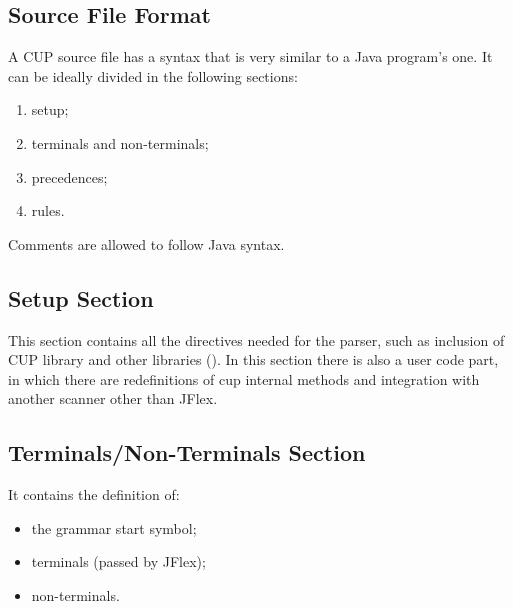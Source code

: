 \subsection{Source File Format}
A CUP source file has a syntax that is very similar to a Java program's one.
It can be ideally divided in the following sections:
\begin{enumerate}
	\item
	setup;
	\item
	terminals and non-terminals;
	\item
	precedences;
	\item
	rules.
\end{enumerate}

Comments are allowed to follow Java syntax.

\subsection{Setup Section}
This section contains all the directives needed for the parser, such as inclusion of CUP library and other libraries ().
In this section there is also a user code part, in which there are redefinitions of cup internal methods and integration with another scanner other than JFlex.

\subsection{Terminals/Non-Terminals Section}
It contains the definition of:
\begin{itemize}
	\item
	the grammar start symbol;
	\item
	terminals (passed by JFlex);
	\item
	non-terminals.
\end{itemize}

